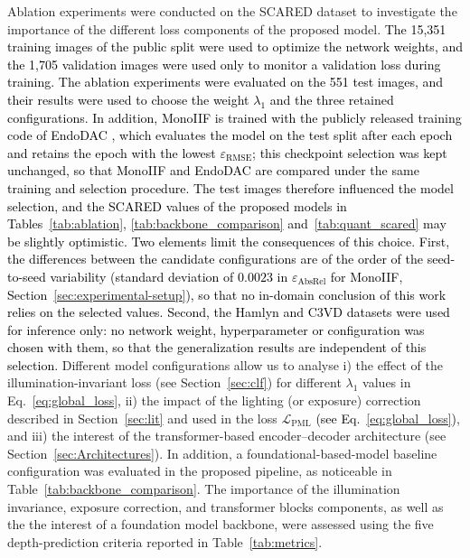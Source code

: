 \documentclass[a4paper,fleqn]{cas-dc}
\begin{document}
Ablation experiments were conducted on the SCARED dataset to investigate the importance of the different loss components of the proposed model. \textcolor{black}{The 15,351 training images of the public split were used to optimize the network weights, and the 1,705 validation images were used only to monitor a validation loss during training. The ablation experiments were evaluated on the 551 test images, and their results were used to choose the weight $\lambda_1$ and the three retained configurations. In addition, MonoIIF is trained with the publicly released training code of EndoDAC \citep{EndoDAC_MICCAI_2024}, which evaluates the model on the test split after each epoch and retains the epoch with the lowest $\varepsilon_\textrm{RMSE}$; this checkpoint selection was kept unchanged, so that MonoIIF and EndoDAC are compared under the same training and selection procedure. The test images therefore influenced the model selection, and the SCARED values of the proposed models in Tables~\ref{tab:ablation}, \ref{tab:backbone_comparison} and~\ref{tab:quant_scared} may be slightly optimistic. Two elements limit the consequences of this choice. First, the differences between the candidate configurations are of the order of the seed-to-seed variability (standard deviation of $0.0023$ in $\varepsilon_\textrm{AbsRel}$ for MonoIIF, Section~\ref{sec:experimental-setup}), so that no in-domain conclusion of this work relies on the selected values. Second, the Hamlyn and C3VD datasets were used for inference only: no network weight, hyperparameter or configuration was chosen with them, so that the generalization results are independent of this selection.} Different model configurations allow us to analyse i) the effect of the illumination-invariant loss (see Section~\ref{sec:clf}) for different $\lambda_1$ values in Eq.~\eqref{eq:global_loss}, ii) the impact of the lighting (or exposure) correction described in Section~\ref{sec:lit} and used in the loss $\mathcal{L}_\textrm{PML}$ \textcolor{black}{(see Eq.~\eqref{eq:global_loss})}, and iii) the interest of the transformer-based encoder–decoder architecture (see Section~\ref{sec:Architectures}). In addition, a foundational-based-model baseline configuration was evaluated in the proposed pipeline, as noticeable in Table~\ref{tab:backbone_comparison}. The importance of the illumination invariance, exposure correction, and transformer blocks components, as well as the the interest of a foundation model backbone, were assessed using the five depth-prediction criteria reported in Table~\ref{tab:metrics}.  
\end{document}
